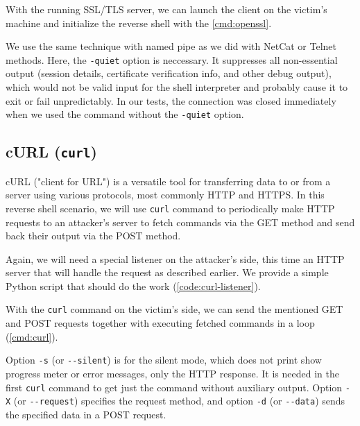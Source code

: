 With the running SSL/TLS server, we can launch the client on the victim's machine and initialize the reverse shell with the \cref{cmd:openssl}.


We use the same technique with named pipe as we did with NetCat or Telnet methods. Here, the \texttt{-quiet} option is neccessary. It suppresses all non-essential output (session details, certificate verification info, and other debug output), which would not be valid input for the shell interpreter and probably cause it to exit or fail unpredictably. In our tests, the connection was closed immediately when we used the command without the \texttt{-quiet} option.


\subsection{cURL (\texttt{curl})}


cURL ("client for URL") is a versatile tool for transferring data to or from a server using various protocols, most commonly HTTP and HTTPS. In this reverse shell scenario, we will use \texttt{curl} command to periodically make HTTP requests to an attacker's server to fetch commands via the GET method and send back their output via the POST method.

Again, we will need a special listener on the attacker's side, this time an HTTP server that will handle the request as described earlier. We provide a simple Python script that should do the work (\cref{code:curl-listener}).


With the \texttt{curl} command on the victim's side, we can send the mentioned GET and POST requests together with executing fetched commands in a loop (\cref{cmd:curl}).


Option \texttt{-s} (or \texttt{-{}-silent}) is for the silent mode, which does not print show progress meter or error messages, only the HTTP response. It is needed in the first \texttt{curl} command to get just the command without auxiliary output. Option \texttt{-X} (or \texttt{-{}-request}) specifies the request method, and option \texttt{-d} (or \texttt{-{}-data}) sends the specified data in a POST request. \cite{curl-man}

